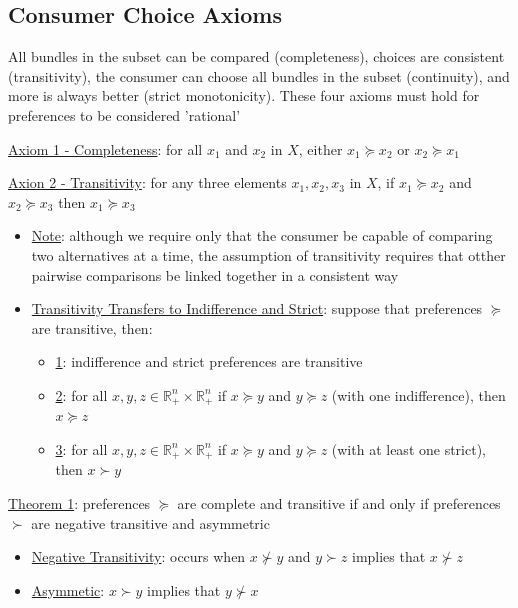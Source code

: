 \documentclass{article}
\begin{document}
\subsection{Consumer Choice Axioms}
All bundles in the subset can be compared (completeness), choices are consistent (transitivity), the consumer can choose all bundles in the subset (continuity), and more is always better (strict monotonicity). These four axioms must hold for preferences to be considered 'rational' \par \vspace{0.3em}
  \underline{Axiom 1 - Completeness}: for all $x_{1}$ and $x_{2}$ in $X$, either $x_{1} \succeq x_{2}$ or $x_{2} \succeq x_{1}$ \par
  \underline{Axion 2 - Transitivity}: for any three elements $x_{1}, x_{2}, x_{3}$ in $X$, if $x_{1} \succeq x_{2}$ and $x_{2} \succeq x_{3}$ then $x_{1} \succeq x_{3}$
  \begin{itemize}
    \item  \underline{Note}: although we require only that the consumer be capable of comparing two alternatives at a time, the assumption of transitivity requires that otther pairwise comparisons be linked together in a consistent way
    \item  \underline{Transitivity Transfers to Indifference and Strict}: suppose that preferences $\succeq$ are transitive, then:
    \begin{itemize}
      \item  \underline{1}: indifference and strict preferences are transitive
      \item  \underline{2}: for all $x, y, z \in \mathbb{R}_{+}^{n} \times \mathbb{R}_{+}^{n}$ if $x \succeq y$ and $y \succeq z$ (with one indifference), then $x \succeq z$
      \item  \underline{3}: for all $x, y, z \in \mathbb{R}_{+}^{n} \times \mathbb{R}_{+}^{n}$ if $x \succeq y$ and $y \succeq z$ (with at least one strict), then $x \succ y$
    \end{itemize}
  \end{itemize}
  \underline{Theorem 1}: preferences $\succeq$ are complete and transitive if and only if preferences $\succ$ are negative transitive and asymmetric
  \begin{itemize}
    \item  \underline{Negative Transitivity}: occurs when $x \nsucc y$ and $y \succ z$ implies that $x \nsucc z$
    \item  \underline{Asymmetic}: $x \succ y$ implies that $y \nsucc x$
  \end{itemize}
\end{document}
